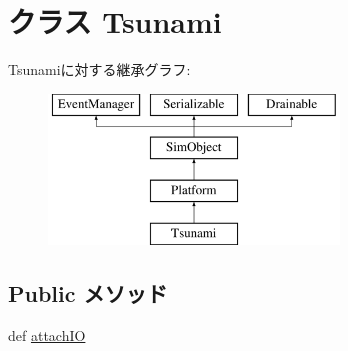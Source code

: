 \hypertarget{classTsunami_1_1Tsunami}{
\section{クラス Tsunami}
\label{classTsunami_1_1Tsunami}
}
Tsunamiに対する継承グラフ:\begin{figure}[H]
\begin{center}
\leavevmode
\includegraphics[height=4cm]{classTsunami_1_1Tsunami}
\end{center}
\end{figure}
\subsection*{Public メソッド}
\begin{DoxyCompactItemize}
\item 
def \hyperlink{classTsunami_1_1Tsunami_ac750675f6d6de3ad52f8c5b03ee45a65}{attachIO}
\end{DoxyCompactItemize}
